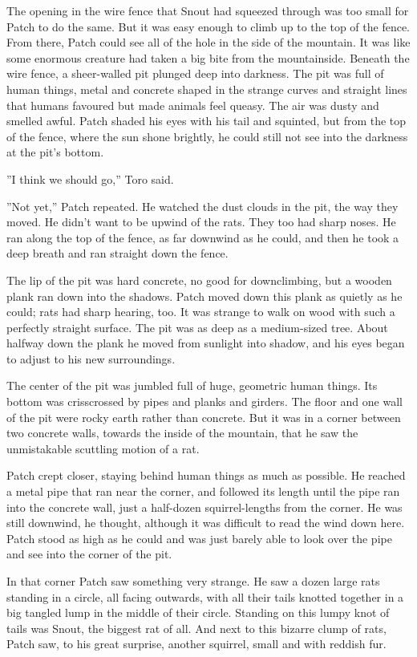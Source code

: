 \documentclass[12pt]{book}
\begin{document}
 The opening in the wire fence that Snout had squeezed through was too small for Patch to do the same. But it was easy enough to climb up to the top of the fence. From there, Patch could see all of the hole in the side of the mountain. It was like some enormous creature had taken a big bite from the mountainside. Beneath the wire fence, a sheer-walled pit plunged deep into darkness. The pit was full of human things, metal and concrete shaped in the strange curves and straight lines that humans favoured but made animals feel queasy. The air was dusty and smelled awful. Patch shaded his eyes with his tail and squinted, but from the top of the fence, where the sun shone brightly, he could still not see into the darkness at the pit's bottom.\par
 ''I think we should go,'' Toro said.\par
 ''Not yet,'' Patch repeated. He watched the dust clouds in the pit, the way they moved. He didn't want to be upwind of the rats. They too had sharp noses. He ran along the top of the fence, as far downwind as he could, and then he took a deep breath and ran straight down the fence.\par
 The lip of the pit was hard concrete, no good for downclimbing, but a wooden plank ran down into the shadows. Patch moved down this plank as quietly as he could; rats had sharp hearing, too. It was strange to walk on wood with such a perfectly straight surface. The pit was as deep as a medium-sized tree. About halfway down the plank he moved from sunlight into shadow, and his eyes began to adjust to his new surroundings.\par
 The center of the pit was jumbled full of huge, geometric human things. Its bottom was crisscrossed by pipes and planks and girders. The floor and one wall of the pit were rocky earth rather than concrete. But it was in a corner between two concrete walls, towards the inside of the mountain, that he saw the unmistakable scuttling motion of a rat.\par
 Patch crept closer, staying behind human things as much as possible. He reached a metal pipe that ran near the corner, and followed its length until the pipe ran into the concrete wall, just a half-dozen squirrel-lengths from the corner. He was still downwind, he thought, although it was difficult to read the wind down here. Patch stood as high as he could and was just barely able to look over the pipe and see into the corner of the pit.\par
 In that corner Patch saw something very strange. He saw a dozen large rats standing in a circle, all facing outwards, with all their tails knotted together in a big tangled lump in the middle of their circle. Standing on this lumpy knot of tails was Snout, the biggest rat of all. And next to this bizarre clump of rats, Patch saw, to his great surprise, another squirrel, small and with reddish fur.\par
\end{document}
